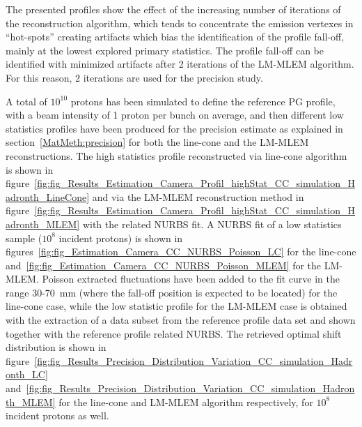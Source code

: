 The presented profiles show the effect of the increasing number of iterations of the reconstruction algorithm, which tends to concentrate the emission vertexes in \enquote{hot-spots} creating artifacts which bias the identification of the profile fall-off, mainly at the lowest explored primary statistics. The profile fall-off can be identified with minimized artifacts after 2 iterations of the LM-MLEM algorithm. For this reason, 2 iterations are used for the precision study.

A total of $10^{10}$ protons has been simulated to define the reference PG profile, with a beam intensity of 1 proton per bunch on average, and then different low statistics profiles have been produced for the precision estimate as explained in section~\ref{MatMeth:precision} for both the line-cone and the LM-MLEM reconstructions. 
The high statistics profile reconstructed via line-cone algorithm is shown in figure~\ref{fig:fig_Results_Estimation_Camera_Profil_highStat_CC_simulation_Hadronth_LineCone} and via the LM-MLEM reconstruction method in figure~\ref{fig:fig_Results_Estimation_Camera_Profil_highStat_CC_simulation_Hadronth_MLEM} with the related NURBS fit. A NURBS fit of a low statistics sample ($10^8$ incident protons) is shown in figures~\ref{fig:fig_Estimation_Camera_CC_NURBS_Poisson_LC} for the line-cone and~\ref{fig:fig_Estimation_Camera_CC_NURBS_Poisson_MLEM} for the LM-MLEM. Poisson extracted fluctuations have been added to the fit curve in the range 30-70~mm (where the fall-off position is expected to be located) for the line-cone case, while the low statistic profile for the LM-MLEM case is obtained with the extraction of a data subset from the reference profile data set and shown together with the reference profile related NURBS.
The retrieved optimal shift distribution is shown in figure~\ref{fig:fig_Results_Precision_Distribution_Variation_CC_simulation_Hadronth_LC} and~\ref{fig:fig_Results_Precision_Distribution_Variation_CC_simulation_Hadronth_MLEM} for the line-cone and LM-MLEM algorithm respectively, for $10^8$ incident protons as well.

